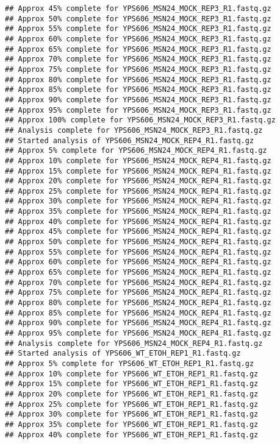 \documentclass[
]{book}
\begin{document}
\begin{verbatim}
## Approx 45% complete for YPS606_MSN24_MOCK_REP3_R1.fastq.gz
## Approx 50% complete for YPS606_MSN24_MOCK_REP3_R1.fastq.gz
## Approx 55% complete for YPS606_MSN24_MOCK_REP3_R1.fastq.gz
## Approx 60% complete for YPS606_MSN24_MOCK_REP3_R1.fastq.gz
## Approx 65% complete for YPS606_MSN24_MOCK_REP3_R1.fastq.gz
## Approx 70% complete for YPS606_MSN24_MOCK_REP3_R1.fastq.gz
## Approx 75% complete for YPS606_MSN24_MOCK_REP3_R1.fastq.gz
## Approx 80% complete for YPS606_MSN24_MOCK_REP3_R1.fastq.gz
## Approx 85% complete for YPS606_MSN24_MOCK_REP3_R1.fastq.gz
## Approx 90% complete for YPS606_MSN24_MOCK_REP3_R1.fastq.gz
## Approx 95% complete for YPS606_MSN24_MOCK_REP3_R1.fastq.gz
## Approx 100% complete for YPS606_MSN24_MOCK_REP3_R1.fastq.gz
## Analysis complete for YPS606_MSN24_MOCK_REP3_R1.fastq.gz
## Started analysis of YPS606_MSN24_MOCK_REP4_R1.fastq.gz
## Approx 5% complete for YPS606_MSN24_MOCK_REP4_R1.fastq.gz
## Approx 10% complete for YPS606_MSN24_MOCK_REP4_R1.fastq.gz
## Approx 15% complete for YPS606_MSN24_MOCK_REP4_R1.fastq.gz
## Approx 20% complete for YPS606_MSN24_MOCK_REP4_R1.fastq.gz
## Approx 25% complete for YPS606_MSN24_MOCK_REP4_R1.fastq.gz
## Approx 30% complete for YPS606_MSN24_MOCK_REP4_R1.fastq.gz
## Approx 35% complete for YPS606_MSN24_MOCK_REP4_R1.fastq.gz
## Approx 40% complete for YPS606_MSN24_MOCK_REP4_R1.fastq.gz
## Approx 45% complete for YPS606_MSN24_MOCK_REP4_R1.fastq.gz
## Approx 50% complete for YPS606_MSN24_MOCK_REP4_R1.fastq.gz
## Approx 55% complete for YPS606_MSN24_MOCK_REP4_R1.fastq.gz
## Approx 60% complete for YPS606_MSN24_MOCK_REP4_R1.fastq.gz
## Approx 65% complete for YPS606_MSN24_MOCK_REP4_R1.fastq.gz
## Approx 70% complete for YPS606_MSN24_MOCK_REP4_R1.fastq.gz
## Approx 75% complete for YPS606_MSN24_MOCK_REP4_R1.fastq.gz
## Approx 80% complete for YPS606_MSN24_MOCK_REP4_R1.fastq.gz
## Approx 85% complete for YPS606_MSN24_MOCK_REP4_R1.fastq.gz
## Approx 90% complete for YPS606_MSN24_MOCK_REP4_R1.fastq.gz
## Approx 95% complete for YPS606_MSN24_MOCK_REP4_R1.fastq.gz
## Analysis complete for YPS606_MSN24_MOCK_REP4_R1.fastq.gz
## Started analysis of YPS606_WT_ETOH_REP1_R1.fastq.gz
## Approx 5% complete for YPS606_WT_ETOH_REP1_R1.fastq.gz
## Approx 10% complete for YPS606_WT_ETOH_REP1_R1.fastq.gz
## Approx 15% complete for YPS606_WT_ETOH_REP1_R1.fastq.gz
## Approx 20% complete for YPS606_WT_ETOH_REP1_R1.fastq.gz
## Approx 25% complete for YPS606_WT_ETOH_REP1_R1.fastq.gz
## Approx 30% complete for YPS606_WT_ETOH_REP1_R1.fastq.gz
## Approx 35% complete for YPS606_WT_ETOH_REP1_R1.fastq.gz
## Approx 40% complete for YPS606_WT_ETOH_REP1_R1.fastq.gz

\end{verbatim}
\end{document}
